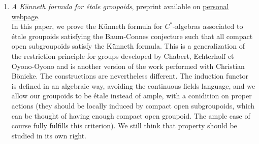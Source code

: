 \documentclass[a4paper]{article}
\begin{document}
\begin{enumerate}
\item \textit{A K\"{u}nneth formula for \'etale groupoids}, preprint available on \href{http://math.hawaii.edu/~dellaiera/Research.html}{personal webpage}.\\

In this paper, we prove the K\"unneth formula for $C^*$-algebras associated to \'etale groupoids satisfying the Baum-Connes conjecture such that all compact open subgroupoids satisfy the K\"unneth formula. This is a generalization of the restriction principle for groups developed by Chabert, Echterhoff et Oyono-Oyono \cite{ChabertEOY} and is another version of the work performed with Christian Bönicke. The constructions are nevertheless different. The induction functor is defined in an algebraic way, avoiding the continuous fields language, and we allow our groupoids to be \'etale instead of ample, with a conidition on proper actions (they should be locally induced by compact open subgroupoids, which can be thought of having enough compact open groupoid. The ample case of course fully fulfills this criterion). We still think that property should be studied in its own right.

\end{enumerate}


 
\end{document}
